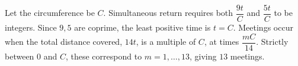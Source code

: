 Let the circumference be $ C $. Simultaneous return requires both $\dfrac{9t}{C}$ and $\dfrac{5t}{C}$ to be integers. Since $ 9,5 $ are coprime, the least positive time is $ t=C $. Meetings occur when the total distance covered, $ 14t $, is a multiple of $ C $, at times $\dfrac{mC}{14}$. Strictly between $ 0 $ and $ C $, these correspond to $ m=1,\ldots,13 $, giving $\boxed{13}$ meetings.

